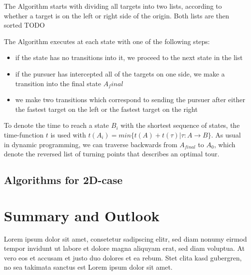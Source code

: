 \documentclass{acm_proc_article-sp}
\begin{document}
The Algorithm starts with dividing all targets into two lists, according to whether a target is on the left or right side of the origin. Both lists are then sorted TODO


The Algorithm executes at each state with one of the following steps:
\begin{itemize}
\item
if the state has no transitions into it, we proceed to the next state in the list
\item
if the pursuer has intercepted all of the targets on one side, we make a transition into
the final state $A_final$
\item
we make two transitions which correspond to sending the pursuer after either the
fastest target on the left or the fastest target on the right

\end{itemize}

To denote the time to reach a state $B_i$ with the shortest sequence of states, the time-function $t$ is used with $t(A_i)=min\{t(A)+t(\tau)|\tau:A\rightarrow B\}$. As usual in dynamic programming, we can traverse backwards from $A_{final}$ to $A_0$, which denote the reversed list of turning points that describes an optimal tour.


\subsection{Algorithms for 2D-case}


\section{Summary and Outlook}
Lorem ipsum dolor sit amet, consetetur sadipscing elitr, sed diam nonumy eirmod tempor invidunt ut labore et dolore magna aliquyam erat, sed diam voluptua. At vero eos et accusam et justo duo dolores et ea rebum. Stet clita kasd gubergren, no sea takimata sanctus est Lorem ipsum dolor sit amet.

{}

\end{document}
